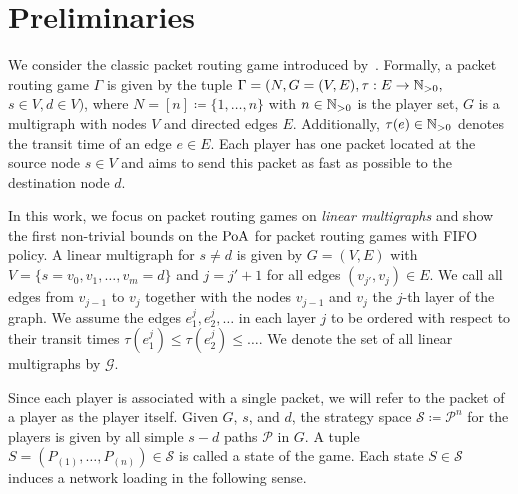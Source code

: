 \section{Preliminaries}\label{sec:prelim}
We consider the classic packet routing game introduced by~\cite{WERTH201418}. Formally, a packet routing game $\Gamma$ is given by the tuple $\Gamma =(N, G=(V,E), \tau: E \rightarrow \mathbb{N}_{>0},$ $s \in V, d \in V)$,
where $N=[n]\coloneq \{1, \dots, n\}$ with $n\in \mathbb{N}_{>0}$ is the player set, $G$ is a multigraph with nodes $V$ and directed edges $E$. Additionally, $\tau(e) \in \mathbb{N}_{>0}$ denotes the transit time of an edge $e \in E$. Each player has one packet located at the source node $s \in V$ and aims to send this packet as fast as possible to the destination node $d$.

In this work, we focus on packet routing games on \emph{linear multigraphs} and show the first non-trivial bounds on the $\operatorname*{PoA}$ for packet routing games with FIFO policy. A linear multigraph for $s\neq d$ is given by $G=(V,E)$ with \mbox{$V=\lbrace s=v_0, v_1, \ldots , v_m = d\rbrace$}  and $j=j'+1$ for all edges $(v_{j'},v_j)\in E$. We call all edges from $v_{j-1}$ to $v_{j}$ together with the nodes $v_{j-1}$ and $v_{j}$ the $j$-th layer of the graph. 
We assume the edges $e^j_1, e^j_2, \ldots$ in each layer $j$ to be ordered with respect to their transit times $\tau(e^j_1)\leq \tau(e^j_2)\leq \ldots$. 
We denote the set of all linear multigraphs by $\mathcal{G}$.
 
Since each player is associated with a single packet, we will refer to the packet of a player as the player itself. Given $G$, $s$, and $d$, the strategy space $\mathcal{S}\coloneqq \mathcal{P}^n$ for the players is given by all simple $s-d$ paths $\mathcal{P}$ in $G$. A tuple $S=(P_{(1)}, \dots, P_{(n)}) \in \mathcal{S}$ is called a state of the game. Each state $S \in \mathcal{S}$ induces a network loading in the following sense.

